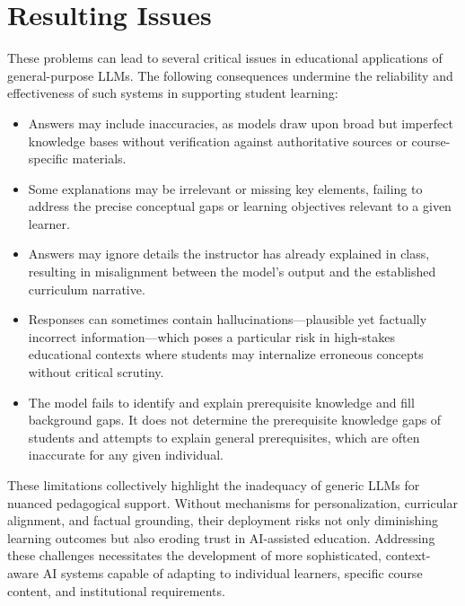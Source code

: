 \section{Resulting Issues}
These problems can lead to several critical issues in educational applications of
general-purpose LLMs. The following consequences undermine the reliability and effectiveness
of such systems in supporting student learning:

\begin{itemize}
    \item Answers may include inaccuracies, as models draw upon broad but imperfect knowledge
          bases without verification against authoritative sources or course-specific materials.
    \item Some explanations may be irrelevant or missing key elements, failing to address
          the precise conceptual gaps or learning objectives relevant to a given learner.
    \item Answers may ignore details the instructor has already explained in class, resulting
          in misalignment between the model's output and the established curriculum narrative.
    \item Responses can sometimes contain hallucinations—plausible yet factually incorrect
          information—which poses a particular risk in high-stakes educational contexts where
          students may internalize erroneous concepts without critical scrutiny.
    \item The model fails to identify and explain prerequisite knowledge and fill background gaps.
          It does not determine the prerequisite knowledge gaps of students and
          attempts to explain general prerequisites, which are often inaccurate for any given
          individual.
\end{itemize}

These limitations collectively highlight the inadequacy of generic LLMs for nuanced pedagogical support. Without mechanisms for personalization, curricular alignment, and factual grounding, their deployment risks not only diminishing learning outcomes but also eroding trust in AI-assisted education. Addressing these challenges necessitates the development of more sophisticated, context-aware AI systems capable of adapting to individual learners, specific course content, and institutional requirements.
